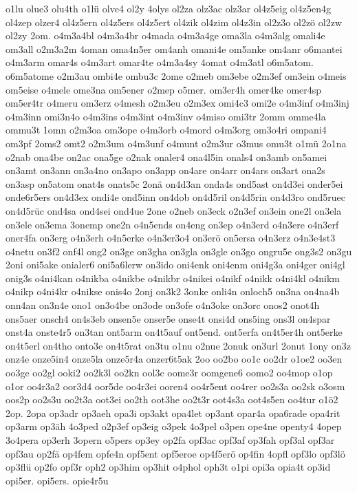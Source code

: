 {o1lu
olue3
olu4th
o1lü
olve4
ol2y
4olys
ol2za
olz3ac
olz3ar
ol4z5eig
ol4z5en4g
ol4zep
olzer4
ol4z5ern
ol4z5ers
ol4z5ert
ol4zik
ol4zim
ol4z3in
ol2z3o
ol2zö
ol2zw
ol2zy
2om.
o4m3a4bl
o4m3a4br
o4mada
o4m3a4ge
oma3la
o4m3alg
omali4e
om3all
o2m3a2m
4oman
oma4n5er
om4anh
omani4e
om5anke
om4anr
o6mantei
o4m3arm
omar4s
o4m3art
omar4te
o4m3a4sy
4omat
o4m3atl
o6m5atom.
o6m5atome
o2m3au
ombi4e
ombu3c
2ome
o2meb
om3ebe
o2m3ef
om3ein
o4meis
om5eise
o4mele
ome3na
om5ener
o2mep
o5mer.
om3er4h
omer4ke
omer4sp
om5er4tr
o4meru
om3erz
o4mesh
o2m3eu
o2m3ex
omi4c3
omi2e
o4m3inf
o4m3inj
o4m3inn
omi3n4o
o4m3ins
o4m3int
o4m3inv
o4miso
omi3tr
2omm
omme4la
ommu3t
1omn
o2m3oa
om3ope
o4m3orb
o4mord
o4m3org
om3o4ri
ompani4
om3pf
2oms2
omt2
o2m3um
o4m3unf
o4munt
o2m3ur
o3mus
omu3t
o1mü
2o1na
o2nab
ona4be
on2ac
ona5ge
o2nak
onaler4
ona4l5in
onals4
on3amb
on5amei
on3amt
on3ann
on3a4no
on3apo
on3app
on4are
on4arr
on4ars
on3art
ona2s
on3asp
on5atom
onat4s
onats5c
2onä
on4d3an
onda4s
ond5ast
on4d3ei
onder5ei
onde6r5ers
on4d3ex
ondi4e
ond5inn
on4dob
on4d5ril
on4d5rin
on4d3ro
ond5ruec
on4d5rüc
ond4sa
ond4sei
ond4ue
2one
o2neb
on3eck
o2n3ef
on3ein
one2l
on3ela
on3ele
on3ema
3onemp
one2n
o4n5ends
on4eng
on3ep
o4n3erd
o4n3ere
o4n3erf
oner4fa
on3erg
o4n3erh
o4n5erke
o4n3er3o4
on3erö
on5ersa
o4n3erz
o4n3e4st3
o4netu
on3f2
onf4l
ong2
on3ge
on3gha
on3gla
on3gle
on3go
ongru5e
ong3s2
on3gu
2oni
oni5ake
onialer6
oni5a6lerw
on3ido
oni4enk
oni4enm
oni4g3a
oni4ger
oni4gl
onig3s
o4ni4kan
o4nikba
o4nikbe
o4nikbr
o4nikei
o4nikf
o4nikk
o4ni4kl
o4nikm
o4nikp
o4ni4kr
o4nikse
onis4o
2onj
on3k2
3onke
onli4n
onloch5
on3na
on4na4b
onn4an
on3n4e
ono1
on3o4be
on3ode
on3ofe
o4n3oke
on3orc
onos2
onot4h
ons5aer
onsch4
on4s3eb
onsen5e
onser5e
onse4t
onsi4d
ons5ing
ons3l
on4spar
onst4a
onste4r5
on3tan
ont5arm
on4t5auf
ont5end.
ont5erfa
on4t5er4h
ont5erke
on4t5erl
on4tho
onto3e
on4t5rat
on3tu
o1nu
o2nue
2onuk
on3url
2onut
1ony
on3z
onz4e
onze5in4
onze5la
onze5r4a
onzer6t5ak
2oo
oo2bo
oo1c
oo2dr
o1oe2
oo3en
oo3ge
oo2gl
ooki2
oo2k3l
oo2kn
ool3c
oome3r
oomgene6
oomo2
oo4mop
o1op
o1or
oo4r3a2
oor3d4
oor5de
oo4r3ei
ooren4
oo4r5ent
oo4rer
oo2s3a
oo2sk
o3osm
oos2p
oo2s3u
oo2t3a
oot3ei
oo2th
oot3he
oo2t3r
oot4s3a
oot4s5en
oo4tur
o1ö2
2op.
2opa
op3adr
op3aeh
opa3i
op3akt
opa4let
op3ant
opar4a
opa6rade
opa4rit
op3arm
op3äh
4o3ped
o2p3ef
op3eig
o3pek
4o3pel
o3pen
ope4ne
openty4
4opep
3o4pera
op3erh
3opern
o5pers
op3ey
op2fa
opf3ac
opf3af
op3fah
opf3al
opf3ar
opf3au
op2fä
op4fem
opfe4n
opf5ent
opf5eroe
op4f5erö
op4fin
4opfl
opf3lo
opf3lö
op3flü
op2fo
opf3r
oph2
op3him
op3hit
o4phol
oph3t
o1pi
opi3a
opia4t
op3id
opi5er.
opi5ers.
opie4r5u
}
